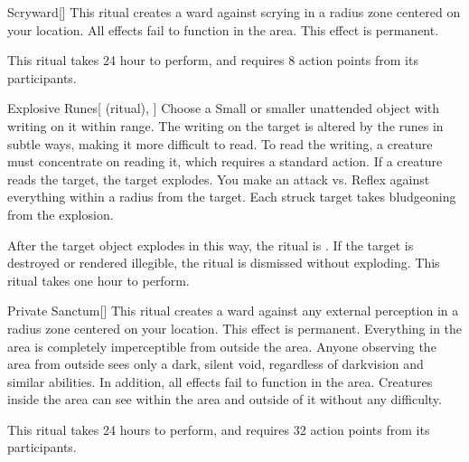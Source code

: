 \lowercase{\hypertarget{spell:Scryward}{}}\label{spell:Scryward}
\begin{ability}[\nth{2}]{\hypertarget{spell:Scryward}{Scryward}}[]
This ritual creates a ward against scrying in a \arealarge radius zone centered on your location.
All  effects fail to function in the area.
This effect is permanent.

This ritual takes 24 hour to perform, and requires 8 action points from its participants.
\end{ability}
\vspace{0.25em}



\lowercase{\hypertarget{spell:Explosive Runes}{}}\label{spell:Explosive Runes}
\begin{ability}[\nth{3}]{\hypertarget{spell:Explosive Runes}{Explosive Runes}}[ (ritual), ]
Choose a Small or smaller unattended object with writing on it within \rngclose range.
The writing on the target is altered by the runes in subtle ways, making it more difficult to read.
To read the writing, a creature must concentrate on reading it, which requires a standard action.
If a creature reads the target, the target explodes.
You make an attack vs. Reflex against everything within a \areamed radius from the target.
Each struck target takes bludgeoning  from the explosion.

After the target object explodes in this way, the ritual is .
If the target is destroyed or rendered illegible, the ritual is dismissed without exploding.
This ritual takes one hour to perform.
\end{ability}
\vspace{0.25em}



\lowercase{\hypertarget{spell:Private Sanctum}{}}\label{spell:Private Sanctum}
\begin{ability}[\nth{4}]{\hypertarget{spell:Private Sanctum}{Private Sanctum}}[]
This ritual creates a ward against any external perception in a \arealarge radius zone centered on your location.
This effect is permanent.
Everything in the area is completely imperceptible from outside the area.
Anyone observing the area from outside sees only a dark, silent void, regardless of darkvision and similar abilities.
In addition, all  effects fail to function in the area.
Creatures inside the area can see within the area and outside of it without any difficulty.

This ritual takes 24 hours to perform, and requires 32 action points from its participants.
\end{ability}
\vspace{0.25em}



